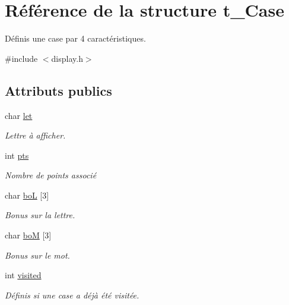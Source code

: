 \hypertarget{structt__Case}{\section{Référence de la structure t\-\_\-\-Case}
\label{structt__Case}
}


Définis une case par 4 caractéristiques.  




{\ttfamily \#include $<$display.\-h$>$}

\subsection*{Attributs publics}
\begin{DoxyCompactItemize}
\item 
\hypertarget{structt__Case_ab8d4688c0772235234ba57f91302d301}{char \hyperlink{structt__Case_ab8d4688c0772235234ba57f91302d301}{let}}\label{structt__Case_ab8d4688c0772235234ba57f91302d301}

\begin{DoxyCompactList}\small\item\em Lettre à afficher. \end{DoxyCompactList}\item 
\hypertarget{structt__Case_a0ca7fb3ede63f530b081a9ba25dd0c42}{int \hyperlink{structt__Case_a0ca7fb3ede63f530b081a9ba25dd0c42}{pts}}\label{structt__Case_a0ca7fb3ede63f530b081a9ba25dd0c42}

\begin{DoxyCompactList}\small\item\em Nombre de points associé \end{DoxyCompactList}\item 
\hypertarget{structt__Case_ac6a23400b09f5d278e5fa52bca741391}{char \hyperlink{structt__Case_ac6a23400b09f5d278e5fa52bca741391}{bo\-L} \mbox{[}3\mbox{]}}\label{structt__Case_ac6a23400b09f5d278e5fa52bca741391}

\begin{DoxyCompactList}\small\item\em Bonus sur la lettre. \end{DoxyCompactList}\item 
\hypertarget{structt__Case_a5eede5d51107927662912a5b307fe6ee}{char \hyperlink{structt__Case_a5eede5d51107927662912a5b307fe6ee}{bo\-M} \mbox{[}3\mbox{]}}\label{structt__Case_a5eede5d51107927662912a5b307fe6ee}

\begin{DoxyCompactList}\small\item\em Bonus sur le mot. \end{DoxyCompactList}\item 
\hypertarget{structt__Case_a36f323f054e3e6e6a95654b63bd90652}{int \hyperlink{structt__Case_a36f323f054e3e6e6a95654b63bd90652}{visited}}\label{structt__Case_a36f323f054e3e6e6a95654b63bd90652}

\begin{DoxyCompactList}\small\item\em Définis si une case a déjà été visitée. \end{DoxyCompactList}\end{DoxyCompactItemize}


